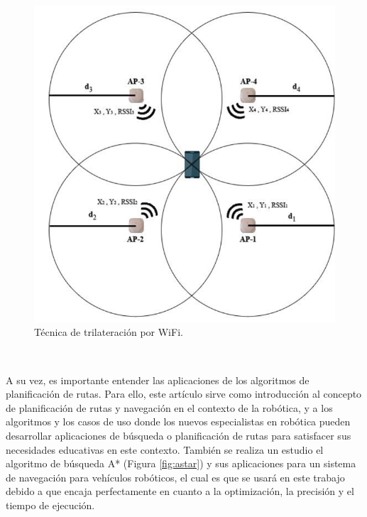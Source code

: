 \begin{figure} [H]
  \begin{center}
    \includegraphics[scale=0.4]{figs/trilateration}
  \end{center}
  \caption{Técnica de trilateración por WiFi.}
  \label{fig:trilateration}
\end{figure}\

A su vez, es importante entender las aplicaciones de los algoritmos de planificación de rutas. Para ello, este artículo \cite{article} sirve como introducción al concepto de planificación de rutas y navegación en el contexto de la robótica, y a los algoritmos y los casos de uso donde los nuevos especialistas en robótica pueden desarrollar aplicaciones de
búsqueda o planificación de rutas para satisfacer sus necesidades educativas en este contexto. También se realiza un estudio el algoritmo de búsqueda A* (Figura \ref{fig:astar}) y sus aplicaciones para un sistema de navegación para vehículos robóticos, el cual es que se usará en este trabajo debido a que encaja perfectamente en cuanto a la optimización, la precisión y el tiempo de ejecución.

